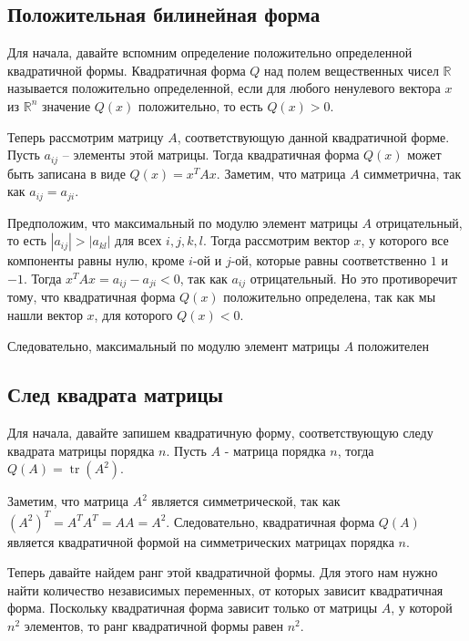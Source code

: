 
 \subsection*{Положительная билинейная форма}

Для начала, давайте вспомним определение положительно определенной квадратичной формы.
Квадратичная форма $Q$ над полем вещественных чисел $\mathbb{R}$ называется положительно определенной, если для
любого ненулевого вектора $x$ из $\mathbb{R}^n$ значение $Q(x)$ положительно, то есть $Q(x) > 0$.

Теперь рассмотрим матрицу $A$, соответствующую данной квадратичной форме.
Пусть $a_{ij}$ -- элементы этой матрицы.
Тогда квадратичная форма $Q(x)$ может быть записана в виде $Q(x) = x^T A x$.
Заметим, что матрица $A$ симметрична, так как $a_{ij} = a_{ji}$.

Предположим, что максимальный по модулю элемент матрицы $A$ отрицательный, то есть $|a_{ij}| > |a_{kl}|$ для всех $i,
j,k,l$.
Тогда рассмотрим вектор $x$, у которого все компоненты равны нулю, кроме $i$-ой и $j$-ой, которые равны
соответственно $1$ и $-1$.
Тогда $x^T A x = a_{ij} - a_{ji} < 0$, так как $a_{ij}$ отрицательный.
Но это противоречит тому, что квадратичная форма $Q(x)$ положительно определена, так как мы нашли вектор $x$, для
которого $Q(x) < 0$.

Следовательно, максимальный по модулю элемент матрицы $A$ положителен

 \subsection*{След квадрата матрицы}

Для начала, давайте запишем квадратичную форму, соответствующую следу квадрата матрицы порядка $n$.
Пусть $A$ - матрица порядка $n$, тогда $Q(A) = \operatorname{tr}(A^2)$.

Заметим, что матрица $A^2$ является симметрической, так как $(A^2)^T = A^T A^T = A A = A^2$.
Следовательно, квадратичная форма $Q(A)$ является квадратичной формой на симметрических матрицах порядка $n$.

Теперь давайте найдем ранг этой квадратичной формы.
Для этого нам нужно найти количество независимых переменных, от которых зависит квадратичная форма.
Поскольку квадратичная форма зависит только от матрицы $A$, у которой $n^2$ элементов, то ранг квадратичной формы
равен $n^2$.

